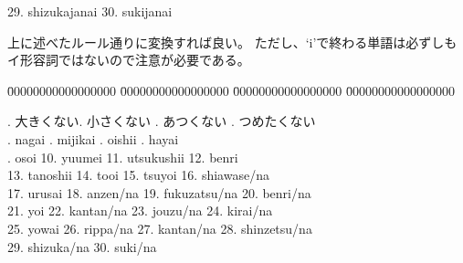 \documentclass[uplatex,dvipdfmx,b5paper,english,10pt]{jsbook}
\begin{document}
\begin{toianswer}
\begin{tabbing}
\>
\hspace{-.5em}29. shizukajanai   \>
\hspace{-.5em}30. sukijanai      \\

\end{tabbing}
\else
上に述べたルール通りに変換すれば良い。
ただし、`i'で終わる単語は必ずしもイ形容詞ではないので注意が必要である。
\begin{tabbing}
 \=
 00000000000000000 \=
 00000000000000000 \=
 00000000000000000 \=
 00000000000000000 \kill

 . 大きくない. 小さくない    . あつくない      . つめたくない   \\

 . nagai      . mijikai    . oishii     . hayai      \\

 . osoi       \>
\hspace{-.5em}10. yuumei       \>
\hspace{-.5em}11. utsukushii   \>
\hspace{-.5em}12. benri        \\

\>
\hspace{-.5em}13. tanoshii     \>
\hspace{-.5em}14. tooi         \>
\hspace{-.5em}15. tsuyoi       \>
\hspace{-.5em}16. shiawase/na  \\

\>
\hspace{-.5em}17. urusai       \>
\hspace{-.5em}18. anzen/na     \>
\hspace{-.5em}19. fukuzatsu/na \>
\hspace{-.5em}20. benri/na     \\

\>
\hspace{-.5em}21. yoi          \>
\hspace{-.5em}22. kantan/na    \>
\hspace{-.5em}23. jouzu/na     \>
\hspace{-.5em}24. kirai/na     \\

\>
\hspace{-.5em}25. yowai        \>
\hspace{-.5em}26. rippa/na     \>
\hspace{-.5em}27. kantan/na    \>
\hspace{-.5em}28. shinzetsu/na \\

\>
\hspace{-.5em}29. shizuka/na   \>
\hspace{-.5em}30. suki/na      \\

\end{tabbing}

\fi
\end{toianswer}
\end{document}
